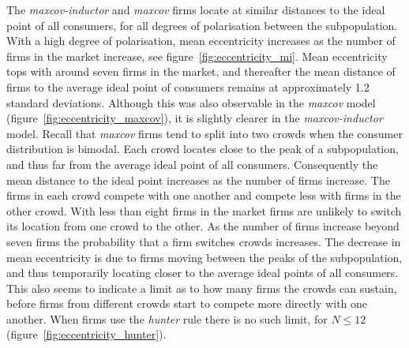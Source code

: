 \documentclass[preprint, 12pt]{elsarticle}
\begin{document}
The \emph{maxcov-inductor} and \emph{maxcov} firms locate at similar distances to the ideal point of all consumers, for all degrees of polarisation between the subpopulation. With a high degree of polarisation, mean eccentricity increases as the number of firms in the market increase, see figure~\ref{fig:eccentricity_mi}. Mean eccentricity tops with around seven firms in the market, and thereafter the mean distance of firms to the average ideal point of consumers remains at approximately 1.2 standard deviations. Although this was also observable in the \emph{maxcov} model (figure~\ref{fig:eccentricity_maxcov}), it is slightly clearer in the \emph{maxcov-inductor} model. Recall that \emph{maxcov} firms tend to split into two crowds when the consumer distribution is bimodal. Each crowd locates close to the peak of a subpopulation, and thus far from the average ideal point of all consumers. Consequently the mean distance to the ideal point increases as the number of firms increase. The firms in each crowd compete with one another and compete less with firms in the other crowd. With less than eight firms in the market firms are unlikely to switch its location from one crowd to the other. As the number of firms increase beyond seven firms the probability that a firm switches crowds increases. The decrease in mean eccentricity is due to firms moving between the peaks of the subpopulation, and thus temporarily locating closer to the average ideal points of all consumers. This also seems to indicate a limit as to how many firms the crowds can sustain, before firms from different crowds start to compete more directly with one another. When firms use the \emph{hunter} rule there is no such limit, for $N \le 12$ (figure~\ref{fig:eccentricity_hunter}).
\end{document}

